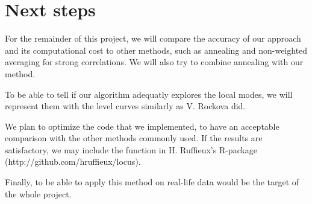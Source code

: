 \documentclass[a4paper, 11pt]{report}
\numberwithin{equation}{chapter}
\begin{document}
\newpage
\chapter{Next steps}
For the remainder of this project, we will compare the accuracy of our approach and its computational cost to other methods, such as annealing and non-weighted averaging for strong correlations. We will also try to combine annealing with our method.\cite{glob}

To be able to tell if our algorithm adequatly explores the local modes, we will represent them with the level curves similarly as V. Rockova \cite{rockova} did.

We plan to optimize the code that we implemented, to have an acceptable comparison with the other methods commonly used. If the results are satisfactory, we may include the function in H. Ruffieux's R-package (http://github.com/hruffieux/locus).

Finally, to be able to apply this method on real-life data would be the target of the whole project.
\newpage


\end{document}
